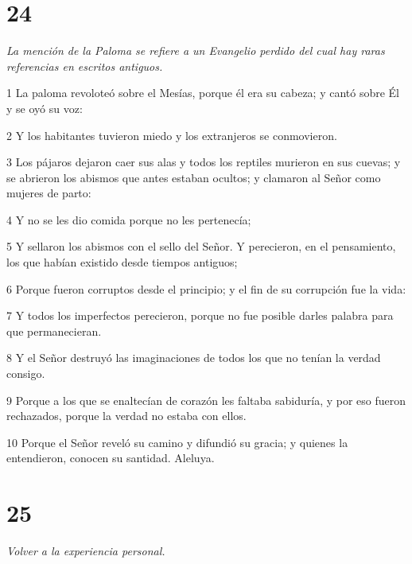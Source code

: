 \chapter{24}

\par \textit{La mención de la Paloma se refiere a un Evangelio perdido del cual hay raras referencias en escritos antiguos.}

\par 1 La paloma revoloteó sobre el Mesías, porque él era su cabeza; y cantó sobre Él y se oyó su voz:
\par 2 Y los habitantes tuvieron miedo y los extranjeros se conmovieron.
\par 3 Los pájaros dejaron caer sus alas y todos los reptiles murieron en sus cuevas; y se abrieron los abismos que antes estaban ocultos; y clamaron al Señor como mujeres de parto:
\par 4 Y no se les dio comida porque no les pertenecía;
\par 5 Y sellaron los abismos con el sello del Señor. Y perecieron, en el pensamiento, los que habían existido desde tiempos antiguos;
\par 6 Porque fueron corruptos desde el principio; y el fin de su corrupción fue la vida:
\par 7 Y todos los imperfectos perecieron, porque no fue posible darles palabra para que permanecieran.
\par 8 Y el Señor destruyó las imaginaciones de todos los que no tenían la verdad consigo.
\par 9 Porque a los que se enaltecían de corazón les faltaba sabiduría, y por eso fueron rechazados, porque la verdad no estaba con ellos.
\par 10 Porque el Señor reveló su camino y difundió su gracia; y quienes la entendieron, conocen su santidad. Aleluya.

\chapter{25}

\par \textit{Volver a la experiencia personal.}

